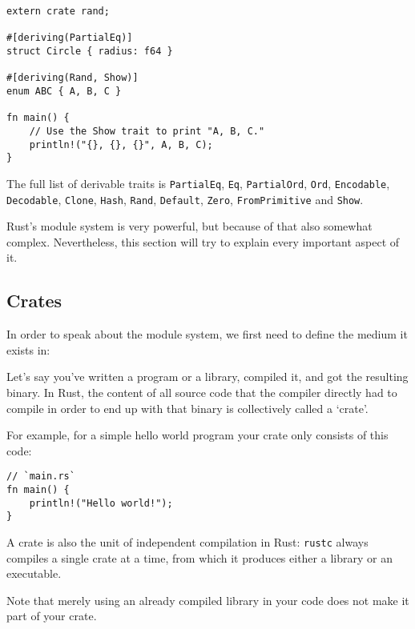\documentclass[]{article}
\begin{document}
\begin{verbatim}
extern crate rand;

#[deriving(PartialEq)]
struct Circle { radius: f64 }

#[deriving(Rand, Show)]
enum ABC { A, B, C }

fn main() {
    // Use the Show trait to print "A, B, C."
    println!("{}, {}, {}", A, B, C);
}
\end{verbatim}

The full list of derivable traits is \texttt{PartialEq}, \texttt{Eq},
\texttt{PartialOrd}, \texttt{Ord}, \texttt{Encodable},
\texttt{Decodable}, \texttt{Clone}, \texttt{Hash}, \texttt{Rand},
\texttt{Default}, \texttt{Zero}, \texttt{FromPrimitive} and
\texttt{Show}.


Rust's module system is very powerful, but because of that also somewhat
complex. Nevertheless, this section will try to explain every important
aspect of it.

\subsection{Crates}\label{crates}

In order to speak about the module system, we first need to define the
medium it exists in:

Let's say you've written a program or a library, compiled it, and got
the resulting binary. In Rust, the content of all source code that the
compiler directly had to compile in order to end up with that binary is
collectively called a `crate'.

For example, for a simple hello world program your crate only consists
of this code:

\begin{verbatim}
// `main.rs`
fn main() {
    println!("Hello world!");
}
\end{verbatim}

A crate is also the unit of independent compilation in Rust:
\texttt{rustc} always compiles a single crate at a time, from which it
produces either a library or an executable.

Note that merely using an already compiled library in your code does not
make it part of your crate.
\end{document}
